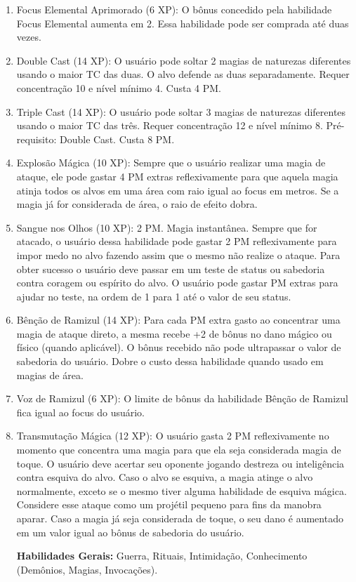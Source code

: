 \begin{enumerate}
 	\item Focus Elemental Aprimorado (6 XP): O bônus concedido pela habilidade Focus Elemental aumenta em 2. Essa habilidade pode ser comprada até duas vezes.
 	
 	\item Double Cast (14 XP): O usuário pode soltar 2 magias de naturezas diferentes usando o maior TC das duas. O alvo defende as duas separadamente. Requer concentração 10 e nível mínimo 4. Custa 4 PM.
 	
 	\item Triple Cast (14 XP): O usuário pode soltar 3 magias de naturezas diferentes usando o maior TC das três. Requer concentração 12 e nível mínimo 8. Pré-requisito: Double Cast. Custa 8 PM.

	\item	Explosão Mágica (10 XP): Sempre que o usuário realizar uma magia de ataque, ele pode gastar 4 PM extras reflexivamente para que aquela magia atinja todos os alvos em uma área com raio igual ao focus em metros. Se a magia já for considerada de área, o raio de efeito dobra.

	\item Sangue nos Olhos (10 XP): 2 PM. Magia instantânea.\newline
Sempre que for atacado, o usuário dessa habilidade pode gastar 2 PM reflexivamente para impor medo no alvo fazendo assim que o mesmo não realize o ataque. Para obter sucesso o usuário deve passar em um teste de status ou sabedoria contra coragem ou espírito do alvo. O usuário pode gastar PM extras para ajudar no teste, na ordem de 1 para 1 até o valor de seu status.

	\item Bênção de Ramizul (14 XP): Para cada PM extra gasto ao concentrar uma magia de ataque direto, a mesma recebe +2 de bônus no dano mágico ou físico (quando aplicável). O bônus recebido não pode ultrapassar o valor de sabedoria do usuário. Dobre o custo dessa habilidade quando usado em magias de área.
  	
  	\item Voz de Ramizul (6 XP): O limite de bônus da habilidade Bênção de Ramizul fica igual ao focus do usuário.
  	
 	\item Transmutação Mágica (12 XP): O usuário gasta 2 PM reflexivamente no momento que concentra uma magia para que ela seja considerada magia de toque. O usuário deve acertar seu oponente jogando destreza ou inteligência contra esquiva do alvo. Caso o alvo se esquiva, a magia atinge o alvo normalmente, exceto se o mesmo tiver alguma habilidade de esquiva mágica. Considere esse ataque como um projétil pequeno para fins da manobra aparar. Caso a magia já seja considerada de toque, o seu dano é aumentado em um valor igual ao bônus de sabedoria do usuário.
  	
\textbf{Habilidades Gerais:} Guerra, Rituais, Intimidação, Conhecimento (Demônios, Magias, Invocações).
 
\end{enumerate}
 
